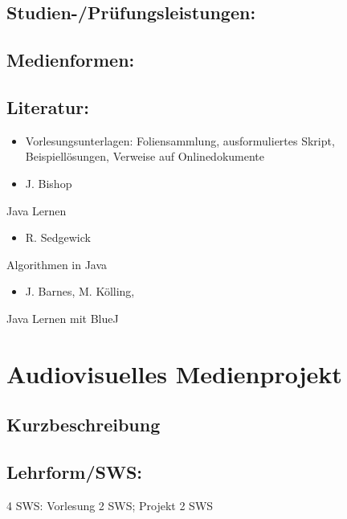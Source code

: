 \section{Studien-/Prüfungsleistungen:}\label{studien-pruxfcfungsleistungen-1}

\section{Medienformen:}\label{medienformen-1}

\section{Literatur:}\label{literatur-1}

\begin{itemize}
\item
  Vorlesungsunterlagen: Foliensammlung, ausformuliertes Skript,
  Beispiellösungen, Verweise auf Onlinedokumente
\item
  J. Bishop
\end{itemize}

Java Lernen

\begin{itemize}
\tightlist
\item
  R. Sedgewick
\end{itemize}

Algorithmen in Java

\begin{itemize}
\tightlist
\item
  J. Barnes, M. Kölling,
\end{itemize}

Java Lernen mit BlueJ

\chapter{Audiovisuelles
Medienprojekt}\label{audiovisuelles-medienprojekt}

\section{Kurzbeschreibung}\label{kurzbeschreibung}

\section{Lehrform/SWS:}\label{lehrformsws-2}

4 SWS: Vorlesung 2 SWS; Projekt 2 SWS

